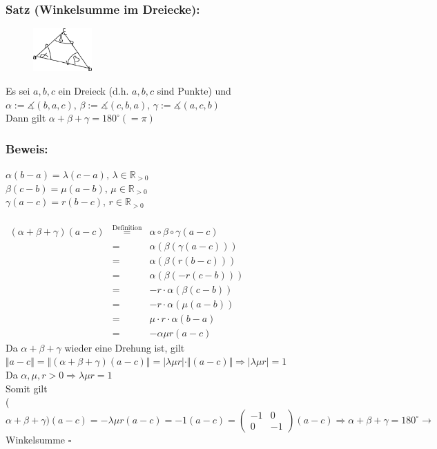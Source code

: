 \subsubsection{Satz (Winkelsumme im Dreiecke):}
 \begin{figure}[H]
 \centering
\includegraphics[width=0.2\textwidth]{mainmatter/chapter1/pics/winkelsumme.png}
\end{figure}
Es sei $a,b,c$ ein Dreieck (d.h. $a,b,c$ sind Punkte) und $\alpha := \measuredangle ( b,a,c), \, \beta := \measuredangle(c,b,a), \, \gamma := \measuredangle (a,c,b)$\\
Dann gilt $\alpha + \beta + \gamma = 180^{\circ} (=\pi)$
%
%
%
\subsubsection{Beweis:}
$\alpha(b-a)=\lambda(c-a), \, \lambda \in \mathbb{R}_{>0}$\\
$\beta(c-b)=\mu(a-b), \, \mu \in \mathbb{R}_{>0}$\\
$\gamma(a-c)= r(b-c), \, r \in \mathbb{R}_{>0}$\\
\qquad\\
$
\begin{array}{rcr}
(\alpha + \beta + \gamma)(a-c) &\mathop{=}\limits^{\text{Definition}}& \alpha \circ \beta \circ \gamma(a-c)\\
 &=&  \alpha (\beta(\gamma(a-c)))\\
 &=& \alpha(\beta(r(b-c)))\\
 &=& \alpha (\beta(-r(c-b)))\\
 &=& -r \cdot \alpha(\beta(c-b))\\
 &=& -r\cdot \alpha(\mu(a-b))\\
 &=& \mu \cdot r \cdot \alpha (b-a)\\
 &=& -\alpha \mu r (a-c)
\end{array} 
$\\
Da $\alpha + \beta + \gamma$ wieder eine Drehung ist, gilt $\Vert a-c\Vert = \Vert (\alpha + \beta + \gamma)(a-c)\Vert=\vert\lambda \mu r\vert \cdot \Vert (a-c)\Vert \Rightarrow \vert \lambda \mu r\vert=1$\\
Da $\alpha, \mu, r > 0 \Rightarrow \lambda\mu r = 1$\\
Somit gilt \\
($\alpha+\beta+\gamma)(a-c)=-\lambda \mu r (a-c) = -1(a-c)=\begin{pmatrix} -1 & 0 \\ 0 & -1\end{pmatrix}(a-c) \Rightarrow \alpha + \beta + \gamma=180^{\circ} \rightarrow$ Winkelsumme $\square$
%
%
%
